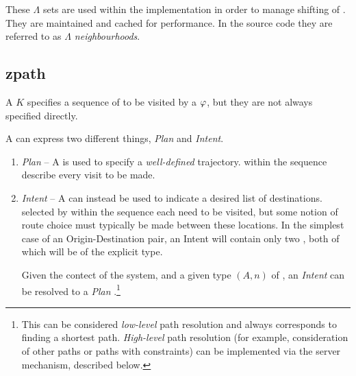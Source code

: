 These $\Lambda$ sets are used within the implementation in order to manage shifting of .
They are maintained and cached for performance. In the source code they are referred to as \emph{$\Lambda$ neighbourhoods}.


\subsection{zpath}

A  ${K}$ specifies a sequence of  to be
visited by a  ${\varphi}$, but they are not always
specified directly.

A  can express two different things, \emph{Plan} and \emph{Intent}.

\begin{enumerate}
  \item \emph{Plan} -- A  is used to specify a \emph{well-defined}
    trajectory.  within the sequence describe every visit
    to be made.  

  \item \emph{Intent} -- A  can instead be used to
    indicate a desired list of destinations.   selected
    by  within the sequence each need to be visited, but
    some notion of route choice must typically be made between these
    locations. In the simplest case of an Origin-Destination pair, an
    Intent  will contain only two , both of
    which will be of the explicit type.
    
    Given the contect of the system, and a given type $(A,n)$
    of , an \emph{Intent}  can be resolved to
    a \emph{Plan} .\footnote{This can be
    considered \emph{low-level} path resolution and always corresponds
    to finding a shortest path. \emph{High-level} path resolution (for
    example, consideration of other paths or paths with constraints)
    can be implemented via the server mechanism, described below.}
\end{enumerate}
  


